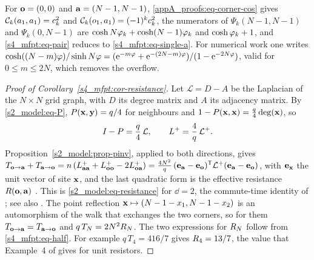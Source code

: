 For $\mathbf{o}=(0,0)$ and $\mathbf{a}=(N-1,N-1)$, \eqref{appA_proofs:eq-corner-cos} gives $\mathcal C_k(a_1,a_1)=c_{k}^{2}$ and
$\mathcal C_k(o_1,a_1)=(-1)^{k}c_{k}^{2}$, the numerators of $\Psi_k(N-1,N-1)$ and $\Psi_k(0,N-1)$ are
$\cosh N\varphi_{k}+\cosh(N-1)\varphi_{k}$ and $\cosh\varphi_{k}+1$, and \eqref{s4_mfpt:eq-pair} reduces to
\eqref{s4_mfpt:eq-single-a}. For numerical work one writes
$\cosh((N-m)\varphi)/\sinh N\varphi=(\mathrm{e}^{-m\varphi}+\mathrm{e}^{-(2N-m)\varphi})/(1-\mathrm{e}^{-2N\varphi})$, valid for
$0\le m\le2N$, which removes the overflow.

\begin{proof}[Proof of Corollary~\ref{s4_mfpt:cor-resistance}]
Let $\mathcal L=D-A$ be the Laplacian of the $N\times N$ grid graph, with $D$ its degree matrix and $A$ its
adjacency matrix. By \eqref{s2_model:eq-P}, $P(\mathbf{x},\mathbf{y})=q/4$ for neighbours and
$1-P(\mathbf{x},\mathbf{x})=\tfrac q4\deg(\mathbf{x})$, so
\begin{equation}\label{appA_proofs:eq-laplacian}
  I-P=\frac q4\,\mathcal L,\qquad L^{+}=\frac4q\,\mathcal L^{+}.
\end{equation}
Proposition~\ref{s2_model:prop-pinv}, applied to both directions, gives
$T_{\mathbf{o}\to\mathbf{a}}+T_{\mathbf{a}\to\mathbf{o}}=n\,(L^{+}_{\mathbf{a}\mathbf{a}}+L^{+}_{\mathbf{o}\mathbf{o}}-2L^{+}_{\mathbf{o}\mathbf{a}})
=\frac{4N^{2}}{q}\,(\mathbf{e}_{\mathbf{a}}-\mathbf{e}_{\mathbf{o}})^{\mathsf{T}}\mathcal L^{+}(\mathbf{e}_{\mathbf{a}}-\mathbf{e}_{\mathbf{o}})$, with $\mathbf{e}_{\mathbf{x}}$ the unit vector of
site $\mathbf{x}$, and the last quadratic form is the effective resistance $R(\mathbf{o},\mathbf{a})$ \citep{KleinRandic1993}. This is
\eqref{s2_model:eq-resistance} for $\dd=2$, the commute-time identity of \citet{Chandra1989}; see also
\citet{Tetali1991}. The point reflection $\mathbf{x}\mapsto(N-1-x_1,N-1-x_2)$ is an automorphism of the walk that
exchanges the two corners, so for them $T_{\mathbf{o}\to\mathbf{a}}=T_{\mathbf{a}\to\mathbf{o}}$ and $q\,T_{N}=2N^{2}R_N$. The two
expressions for $R_N$ follow from \eqref{s4_mfpt:eq-half}. For example $q\,T_{4}=416/7$ gives $R_4=13/7$,
the value that Example~4 of \citet{Wu2004} gives for unit resistors.
\end{proof}

